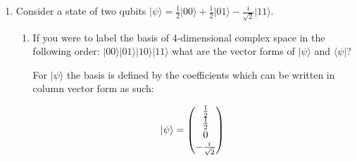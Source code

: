 \documentclass[10pt]{article}
\newcommand{\ket}[1]{\vert #1 \rangle}
\newcommand{\bra}[1]{\langle #1 \vert}
\newcommand{\braket}[2]{\langle #1 \vert #2 \rangle}
\begin{document}
\begin{enumerate}
\begin{enumerate}
        The second probability Prob($\frac12$) can be calculated like so:

        \begin{align*}
         \bra{-} &= \frac{1}{\sqrt2} (\bra{0} - \bra{1}) = \frac{1}{\sqrt2}(1 \ -1) \\
         \braket{-}{\psi} &= \frac{1}{\sqrt2}(1 \ -1) \begin{pmatrix} a \\ b \end{pmatrix} = \frac{1}{\sqrt2} (a -b)
        \end{align*}

        Using the same logic from Prob(1) where $\braket{-}{\psi}$ is just the squared magnitude of $\frac{1}{\sqrt2}(a-b)$, and the absolute square of a complex number $z$ is defined as $|z| = zz^*$ where $z^*$ is the complex conjugate, we can write out the following:

        \begin{align*}
          Prob(\frac12) &= \frac12 (|a|^2 + |b|^2 - ab^* - a^*b) \\
                  &= \frac12 (1 - (ab* + a^*b)) \\
                  &= \frac12 (1 - 2Re(ab^*)) \ a^*b \text{ is the complex conjugate of } ab^* \\
                  &= \frac12 - Re(ab^*)
        \end{align*}

        As a sanity check, if we add these two probabilities together, we should get 1:

        $$
        \frac12 + Re(ab^*) + \frac12 - Re(ab^*) = 1
        $$

      \end{enumerate}

    \item{Consider a state of two qubits $\ket{\psi} = \frac12 \ket{00} + \frac12 \ket{01} - \frac{i}{\sqrt2} \ket{11}$.}

      \begin{enumerate}
        \item{If you were to label the basis of 4-dimensional complex space in the following order: $\ket{00} \ket{01} \ket{10} \ket{11}$ what are the vector forms of $\ket{\psi}$ and $\bra{\psi}$?}

          For $\ket{\psi}$ the basis is defined by the coefficients which can be written in column vector form as such:

          \begin{equation*}
            \ket{\psi} = \begin{pmatrix} \frac12 \\ \frac12 \\ 0 \\ -\frac{i}{\sqrt2} \end{pmatrix} \\
          \end{equation*}


\end{enumerate}
\end{enumerate}
\end{document}
